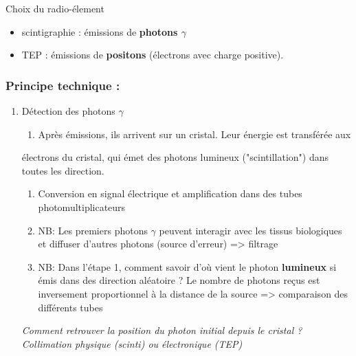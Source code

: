 \documentclass[11pt]{article}
\begin{document}
Choix du radio-élement
\begin{itemize}
\item scintigraphie : émissions de \textbf{photons \(\gamma\)}
\item TEP : émissions de \textbf{positons} (électrons avec charge positive).
\end{itemize}
\subsubsection{Principe technique :}
\label{sec:org6560a90}
\begin{enumerate}
\item Détection des photons \(\gamma\)
\label{sec:orgc113dfc}
\begin{enumerate}
\item Après émissions, ils arrivent sur un cristal. Leur énergie est transférée aux
\end{enumerate}
électrons du cristal, qui émet des photons lumineux ("scintillation") dans
toutes les direction.
\begin{enumerate}
\item Conversion en signal électrique et amplification dans des tubes photomultiplicateurs
\item NB: Les premiers photons \(\gamma\) peuvent interagir avec les tissus biologiques et
diffuser d'autres photons (source d'erreur) => filtrage
\item NB: Dans l'étape 1, comment savoir d'où vient le photon \textbf{lumineux} si émis
dans des direction aléatoire ? Le nombre de photons reçus est inversement
proportionnel à la distance de la source => comparaison des différents tubes
\end{enumerate}
\emph{Comment retrouver la position du photon initial depuis le cristal ? Collimation physique (scinti) ou  électronique (TEP)}


\end{enumerate}
\end{document}
